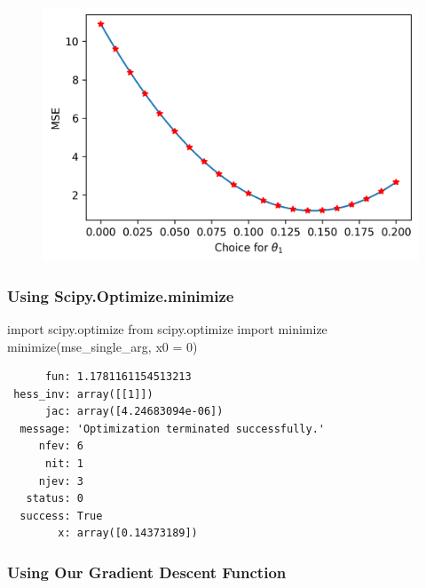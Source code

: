 \documentclass[
  letterpaper,
  DIV=11,
  numbers=noendperiod]{scrreprt}
\newenvironment{Shaded}{\begin{snugshade}}{\end{snugshade}}
\newcommand{\DecValTok}[1]{\textcolor[rgb]{0.68,0.00,0.00}{#1}}
\newcommand{\ImportTok}[1]{\textcolor[rgb]{0.00,0.46,0.62}{#1}}
\newcommand{\NormalTok}[1]{\textcolor[rgb]{0.00,0.23,0.31}{#1}}
\newcommand{\OperatorTok}[1]{\textcolor[rgb]{0.37,0.37,0.37}{#1}}
\begin{document}
\begin{figure}[H]

{\centering \includegraphics{gradient_descent/gradient_descent_files/figure-pdf/cell-29-output-1.png}

}

\end{figure}

\hypertarget{using-scipy.optimize.minimize}{%
\subsubsection{Using
Scipy.Optimize.minimize}\label{using-scipy.optimize.minimize}}

\begin{Shaded}
\begin{Highlighting}[]
\ImportTok{import}\NormalTok{ scipy.optimize}
\ImportTok{from}\NormalTok{ scipy.optimize }\ImportTok{import}\NormalTok{ minimize}
\NormalTok{minimize(mse\_single\_arg, x0 }\OperatorTok{=} \DecValTok{0}\NormalTok{)}
\end{Highlighting}
\end{Shaded}

\begin{verbatim}
      fun: 1.1781161154513213
 hess_inv: array([[1]])
      jac: array([4.24683094e-06])
  message: 'Optimization terminated successfully.'
     nfev: 6
      nit: 1
     njev: 3
   status: 0
  success: True
        x: array([0.14373189])
\end{verbatim}

\hypertarget{using-our-gradient-descent-function}{%
\subsubsection{Using Our Gradient Descent
Function}\label{using-our-gradient-descent-function}}
\end{document}
